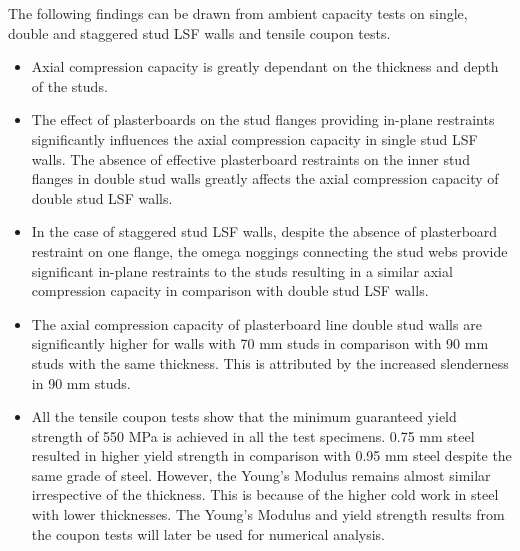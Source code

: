 The following findings can be drawn from ambient capacity tests on single, double and staggered stud LSF walls and tensile coupon tests.
\begin{itemize}
	\item Axial compression capacity is greatly dependant on the thickness and depth of the studs.
	\item The effect of plasterboards on the stud flanges providing in-plane restraints significantly influences the axial compression capacity in single stud LSF walls. The absence of effective plasterboard restraints on the inner stud flanges in double stud walls greatly affects the axial compression capacity of double stud LSF walls.
	\item In the case of staggered stud LSF walls, despite the absence of plasterboard restraint on one flange, the omega noggings connecting the stud webs provide significant in-plane restraints to the studs resulting in a similar axial compression capacity in comparison with double stud LSF walls.
	\item The axial compression capacity of plasterboard line double stud walls are significantly higher for walls with 70 mm studs in comparison with 90 mm studs with the same thickness. This is attributed by the increased slenderness in 90 mm studs. 
	\item All the tensile coupon tests show that the minimum guaranteed yield strength of 550 MPa is achieved in all the test specimens. 0.75 mm steel resulted in higher yield strength in comparison with 0.95 mm steel despite the same grade of steel. However, the Young's Modulus remains almost similar irrespective of the thickness. This is because of the higher cold work in steel with lower thicknesses. The Young's Modulus and yield strength results from the coupon tests will later be used for numerical analysis. 
\end{itemize}
  
  
  
